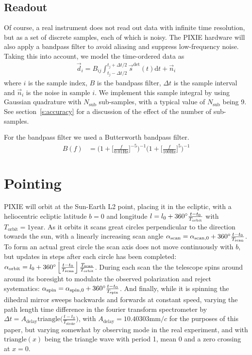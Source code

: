 \documentclass{article}
\begin{document}
\subsection{Readout}
Of course, a real instrument does not read out data with infinite
time resolution, but as a set of discrete samples, each of which is
noisy. The PIXIE hardware will also apply a bandpass filter to avoid
aliasing and suppress low-frequency noise. Taking this into account,
we model the time-ordered data as
\begin{align}
	\vec d_i = B_{ij} \int_{t_j-\Delta t/2}^{t_j+\Delta t/2} \vec s^\textrm{det}(t) \textrm{d}t + \vec n_i
\end{align}
where $i$ is the sample index, $B$ is the bandpass filter, $\Delta t$ is the sample
interval and $\vec n_i$ is the noise in sample $i$. We implement this
sample integral by using Gaussian quadrature with $N_\textrm{sub}$ sub-samples,
with a typical value of $N_\textrm{sub}$ being 9. See section~\ref{s:accuracy}
for a discussion of the effect of the number of sub-samples.

For the bandpass filter we used a Butterworth bandpass filter.
\begin{align}
	B(f) &= \Big(1+\Big[\frac{f}{0.01\textrm{Hz}}\Big]^{-5}\Big)^{-1}
		\Big(1+\Big[\frac{f}{100\textrm{Hz}}\Big]^{5}\Big)^{-1}
\end{align}

\section{Pointing}
\label{sec:pointing}
PIXIE will orbit at the Sun-Earth L2 point, placing it in the ecliptic, with
a heliocentric ecliptic latitude $b=0$ and longitude $l=l_0 +
360\degree\frac{t-t_0}{T_\textrm{orbit}}$ with $T_\textrm{orbit} = 1\textrm{year}$.
As it orbits it scans great circles
perpendicular to the direction towards the sun, with a linearly increasing scan angle
$\alpha_\textrm{scan} = \alpha_{\textrm{scan},0} + 360\degree \frac{t-t_0}{T_\textrm{scan}}$.
To form an actual great circle the scan axis does not
move continuously with $b$, but updates in steps after each circle has been completed:
$\alpha_\textrm{orbit} = l_0 + 360\degree\left\lfloor\frac{t-t_0}{T_\textrm{scan}}\right\rfloor\frac{T_\textrm{scan}}{T_\textrm{orbit}}$.
During each scan the the telescope spins around around its boresight to modulate
the observed polarization and reject systematics: $\alpha_\textrm{spin} =
\alpha_{\textrm{spin},0} + 360\degree\frac{t-t_0}{T_\textrm{spin}}$. And finally,
while it is spinning the dihedral mirror sweeps backwards and forwards at constant
speed, varying the path length time difference in the fourier transform spectrometer
by $\Delta t = A_\textrm{delay}\textrm{triangle}\Big(\frac{t-t_0}{T_\textrm{stroke}}\Big)$,
with $A_\textrm{delay} = 10.40303 \textrm{mm}/c$ for the purposes of this paper, but
varying somewhat by observing mode in the real experiment, and with
$\textrm{triangle}(x)$ being the triangle wave with period 1, mean 0 and a zero
crossing at $x=0$.
\end{document}
